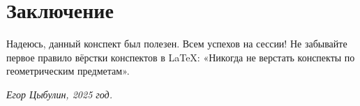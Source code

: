 \section{Заключение}
Надеюсь, данный конспект был полезен. Всем успехов на сессии! Не забывайте первое правило вёрстки конспектов в \LaTeX: «Никогда не верстать конспекты по геометрическим предметам».
\begin{flushright}
    \textit{Егор Цыбулин, 2025 год.}
\end{flushright}